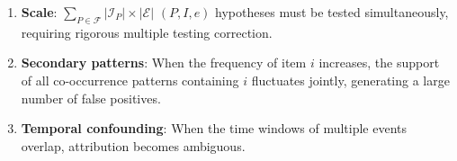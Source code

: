 \begin{enumerate}
\item \textbf{Scale}: $\sum_{P \in \mathcal{F}} |\mathcal{I}_P| \times |\mathcal{E}|$
$(P, I, e)$ hypotheses must be tested simultaneously,
requiring rigorous multiple testing correction.

\item \textbf{Secondary patterns}: When the frequency of item $i$ increases,
the support of all co-occurrence patterns containing $i$ fluctuates jointly,
generating a large number of false positives.

\item \textbf{Temporal confounding}: When the time windows of multiple events overlap,
attribution becomes ambiguous.
\end{enumerate}
